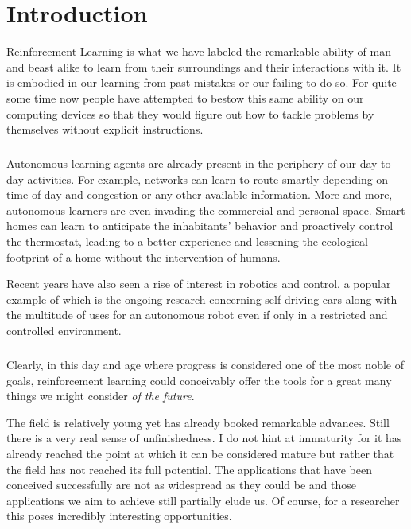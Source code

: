 \chapter{Introduction}

\label{introduction}
Reinforcement Learning is what we have labeled the remarkable ability of man and beast alike
to learn from their surroundings and their interactions with it.
It is embodied in our learning from past mistakes or our failing to do so.
For quite some time now people have attempted to bestow this same ability on
our computing devices so that they would figure out how to tackle problems by themselves
without explicit instructions.

\paragraph{}
Autonomous learning agents are already present
in the periphery of our day to day activities.
For example,
networks can learn to route smartly
depending on time of day
and congestion
or any other available information.
More and more,
autonomous learners are even invading
the commercial and personal space.
Smart homes can learn to anticipate the inhabitants'
behavior and proactively control the thermostat,
leading to a better experience
and lessening the ecological footprint of a home
without the intervention of humans.

Recent years have also seen a rise of interest
in robotics and control,
a popular example of which is the ongoing research
concerning self-driving cars
\parencite{selfdriving}
along with the multitude of uses for an autonomous robot
even if only in a restricted and controlled environment.

\paragraph{}
Clearly,
in this day and age
where progress is considered
one of the most noble of goals,
reinforcement learning could conceivably
offer the tools
for a great many things
we might consider \textit{of the future}.

The field is relatively young
yet has already booked remarkable advances.
Still there is a very real sense of unfinishedness.
I do not hint at immaturity
for it has already reached the point
at which it can be considered mature
but rather that the field has not reached its full potential.
The applications that have been conceived successfully
are not as widespread as they could be
and those applications we aim to achieve
still partially elude us.
Of course, for a researcher
this poses incredibly interesting opportunities.

